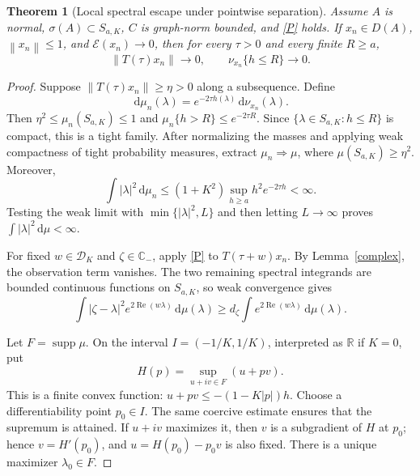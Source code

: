 \documentclass[11pt,a4paper]{article}
\newtheorem{theorem}{Theorem}[section]
\theoremstyle{definition}\newtheorem{definition}[theorem]{Definition}
\theoremstyle{remark}\newtheorem{remark}[theorem]{Remark}
\newcommand{\C}{\mathbb C}\newcommand{\R}{\mathbb R}\newcommand{\N}{\mathbb N}
\newcommand{\E}{\mathcal E}\newcommand{\D}{\mathcal D}
\newcommand{\dd}{\,\mathrm d}
\DeclareMathOperator{\Rea}{Re}\DeclareMathOperator{\Ima}{Im}
\DeclareMathOperator{\supp}{supp}\DeclareMathOperator{\sgn}{sgn}
\newcommand{\norm}[1]{\left\lVert #1\right\rVert}
\begin{document}
\begin{theorem}[Local spectral escape under pointwise separation]\label{escape}
Assume $A$ is normal, $\sigma(A)\subset S_{a,K}$, $C$ is graph-norm bounded, and \eqref{P} holds. If $x_n\in D(A)$, $\norm{x_n}\le1$, and $\E(x_n)\to0$, then for every $\tau>0$ and every finite $R\ge a$,
\begin{equation}\label{escape-concl}
 \norm{T(\tau)x_n}\to0,
 \qquad
 \nu_{x_n}\{h\le R\}\to0.
\end{equation}
\end{theorem}
\begin{proof}
Suppose $\norm{T(\tau)x_n}\ge\eta>0$ along a subsequence. Define
\[
 \dd\mu_n(\lambda)=e^{-2\tau h(\lambda)}\dd\nu_{x_n}(\lambda).
\]
Then $\eta^2\le\mu_n(S_{a,K})\le1$ and
$\mu_n\{h>R\}\le e^{-2\tau R}$. Since $\{\lambda\in S_{a,K}:h\le R\}$ is compact, this is a tight family. After normalizing the masses and applying weak compactness of tight probability measures, extract $\mu_n\Rightarrow\mu$, where $\mu(S_{a,K})\ge\eta^2$. Moreover,
\[
 \int |\lambda|^2\dd\mu_n\le
 (1+K^2)\sup_{h\ge a}h^2e^{-2\tau h}<\infty.
\]
Testing the weak limit with $\min\{|\lambda|^2,L\}$ and then letting $L\to\infty$ proves $\int|\lambda|^2\dd\mu<\infty$.

For fixed $w\in\D_K$ and $\zeta\in\C_-$, apply \eqref{P} to $T(\tau+w)x_n$. By Lemma~\ref{complex}, the observation term vanishes. The two remaining spectral integrands are bounded continuous functions on $S_{a,K}$, so weak convergence gives
\begin{equation}\label{escape-weak}
 \int |\zeta-\lambda|^2e^{2\Rea(w\lambda)}\dd\mu(\lambda)
 \ge d_\zeta\int e^{2\Rea(w\lambda)}\dd\mu(\lambda).
\end{equation}

Let $F=\supp\mu$. On the interval $I=(-1/K,1/K)$, interpreted as $\R$ if $K=0$, put
\[
 H(p)=\sup_{u+iv\in F}(u+pv).
\]
This is a finite convex function: $u+pv\le-(1-K|p|)h$. Choose a differentiability point $p_0\in I$. The same coercive estimate ensures that the supremum is attained. If $u+iv$ maximizes it, then $v$ is a subgradient of $H$ at $p_0$; hence $v=H'(p_0)$, and $u=H(p_0)-p_0v$ is also fixed. There is a unique maximizer $\lambda_0\in F$.


\end{proof}
\end{document}
